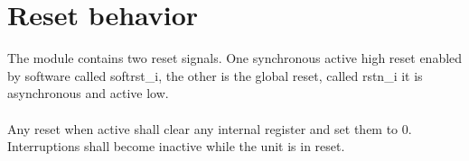 \section{Reset behavior}

The module contains two reset signals. One synchronous active high reset enabled by software called softrst\_i, the other is the global reset, called rstn\_i it is asynchronous and active low.\\
\\
Any reset when active shall clear any internal register and set them to 0. Interruptions shall become inactive while the unit is in reset.




